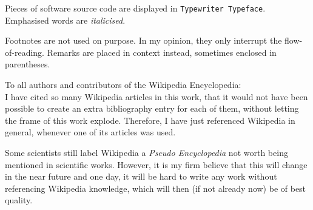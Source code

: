 Pieces of software source code are displayed in \texttt{Typewriter Typeface}.
Emphasised words are \emph{italicised}.

Footnotes are not used on purpose. In my opinion, they only interrupt the
flow-of-reading. Remarks are placed in context instead, sometimes enclosed in
parentheses.

To all authors and contributors of the Wikipedia Encyclopedia:\\
I have cited so many Wikipedia articles in this work, that it would
not have been possible to create an extra bibliography entry for each
of them, without letting the frame of this work explode. Therefore,
I have just referenced Wikipedia in general, whenever one of its
articles was used.

Some scientists still label Wikipedia a \emph{Pseudo Encyclopedia} not worth
being mentioned in scientific works. However, it is my firm believe that this
will change in the near future and one day, it will be hard to write any work
without referencing Wikipedia knowledge, which will then (if not already now)
be of best quality.
